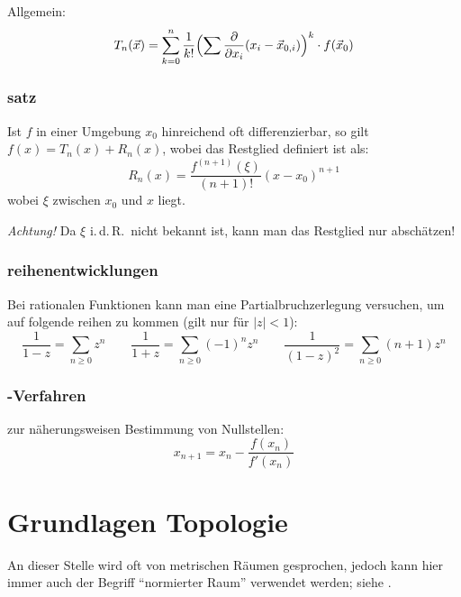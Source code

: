 Allgemein:
\[ T_n(\vec x) = \sum_{k=0}^n \frac{1}{k!} \Bigl(\sum \frac{\partial}{\partial x_i}(x_i-\vec x_{0,i}) \Bigr)^k \cdot f(\vec x_0) \]


\subsection{\protect{}satz}

Ist $f$ in einer Umgebung $x_0$ hinreichend oft differenzierbar, so gilt $f(x)=T_n (x) + R_n (x)$, wobei das Restglied definiert ist als:
\[ R_n (x) = \frac{f^{(n+1)}(\xi)}{(n+1)!} (x-x_0)^{n+1} \]
wobei $\xi$ zwischen $x_0$ und $x$ liegt.

\emph{Achtung!} Da $\xi$ i.\,d.\,R.~nicht bekannt ist, kann man das Restglied nur abschätzen!


\subsection{reihenentwicklungen}

Bei rationalen Funktionen kann man eine Partialbruchzerlegung versuchen, um auf folgende reihen zu kommen (gilt nur für $\lvert z \rvert < 1$):
\[
  \frac{1}{1-z}=\sum_{n\geq0} z^n
  \qquad
  \frac{1}{1+z}=\sum_{n\geq0} (-1)^n z^n
  \qquad
  \frac{1}{(1-z)^{2}}=\sum_{n\geq0} (n+1)z^n
\]


\subsection{\protect{}-Verfahren}

zur näherungsweisen Bestimmung von Nullstellen:
\[ x_{n+1}=x_{n}-\frac{f(x_{n})}{f'(x_{n})} \]



\chapter{\label{chap:topologie}Grundlagen Topologie}
An dieser Stelle wird oft von metrischen Räumen gesprochen, jedoch kann hier immer auch der Begriff \enquote{normierter Raum} verwendet werden; siehe .

